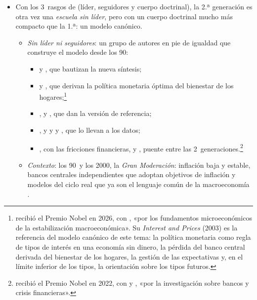 \documentclass[11pt]{article}
\begin{document}
\begin{itemize}
\item Con los 3~rasgos de  (líder, seguidores y cuerpo doctrinal), la 2.ª generación es otra vez una \emph{escuela sin líder}, pero con un cuerpo doctrinal mucho más compacto que la 1.ª: un modelo canónico.
  \begin{itemize}
  \item \emph{Sin líder ni seguidores}: un grupo de autores en pie de igualdad que construye el modelo desde los 90:
    \begin{itemize}
    \item {} y , que bautizan la nueva síntesis\nocite{GoodfriendKing1997New};
    \item {} y , que derivan la política monetaria óptima del bienestar de los hogares\nocite{RotembergWoodford1997Optimization,Woodford2003Interest};\footnote{ recibió el Premio Nobel en 2026, con , «por los fundamentos microeconómicos de la estabilización macroeconómica»\nocite{Nobel2026Prensa}. Su \emph{Interest and Prices} (2003) es la referencia del modelo canónico de este tema: la política monetaria como regla de tipos de interés en una economía sin dinero, la pérdida del banco central derivada del bienestar de los hogares, la gestión de las expectativas y, en el límite inferior de los tipos, la orientación sobre los tipos futuros\nocite{Nobel2026Cientifico}.}
    \item {},  y , que dan la versión de referencia\nocite{ClaridaGaliGertler1999Science};
    \item {},  y \nocite{ChristianoEichenbaumEvans2005} y  y \nocite{SmetsWouters2003Estimated}, que lo llevan a los datos;
    \item {}, con las fricciones financieras, y , puente entre las 2~generaciones.\footnote{ recibió el Premio Nobel en 2022, con  y , «por la investigación sobre bancos y crisis financieras»\nocite{Nobel2022}.}
    \end{itemize}
  \item \emph{Contexto}: los 90~y los 2000, la \emph{Gran Moderación}: inflación baja y estable, bancos centrales independientes que adoptan objetivos de inflación y modelos del ciclo real que ya son el lenguaje común de la macroeconomía .

\end{itemize}
\end{itemize}
\end{document}
